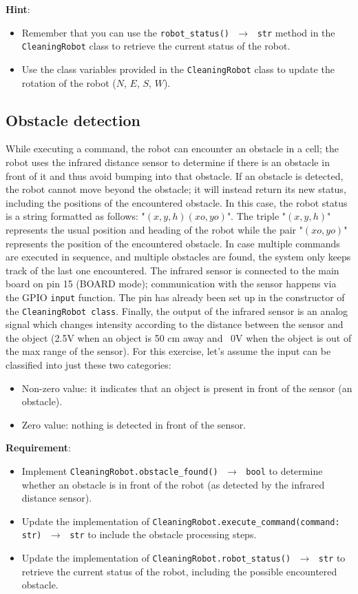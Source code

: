 \noindent\textbf{Hint}:
\begin{itemize}
    \item Remember that you can use the \texttt{robot\_status() $\,\to\,$ str} method in the \texttt{CleaningRobot} class to retrieve the current status of the robot.
    \item Use the class variables provided in the \texttt{CleaningRobot} class to update the rotation of the robot ($N$, $E$, $S$, $W$).
\end{itemize}


\subsection{Obstacle detection}
While executing a command, the robot can encounter an obstacle in a cell;  the robot uses the infrared distance sensor to determine if there is an obstacle in front of it and thus avoid bumping into that obstacle. If an obstacle is detected, the robot cannot move beyond the obstacle; it will instead return its new status, including the positions of the encountered obstacle. In this case, the robot status is a string formatted as follows: "$(x,y,h)(xo,yo)$". The triple "$(x,y,h)$" represents the usual position and heading of the robot while the pair "$(xo,yo)$" represents the position of the encountered obstacle.
In case multiple commands are executed in sequence, and multiple obstacles are found, the system only keeps track of the last one encountered.
The infrared sensor is connected to the main board on pin 15 (BOARD mode); communication with the sensor happens via the GPIO \texttt{input} function. The pin has already been set up in the constructor of the \texttt{CleaningRobot class}. 
Finally, the output of the infrared sensor is an analog signal which changes intensity according to the distance between the sensor and the object (\ie 2.5V when an object is 50 cm away and ~0V when the object is out of the max range of the sensor). For this exercise, let's assume the input can be classified into just these two categories:
\begin{itemize}
    \item Non-zero value: it indicates that an object is present in front of the sensor (\ie an obstacle).
    \item Zero value: nothing is detected in front of the sensor.
\end{itemize}

\noindent\textbf{Requirement}:
\begin{itemize}
    \item Implement \texttt{CleaningRobot.obstacle\_found() $\,\to\,$  bool} to determine whether an obstacle is in front of the robot (as detected by the infrared distance sensor).
    \item Update the implementation of \texttt{CleaningRobot.execute\_command(command: str) $\,\to\,$  str} to include the obstacle processing steps.
    \item Update the implementation of \texttt{CleaningRobot.robot\_status() $\,\to\,$  str} to retrieve the current status of the robot, including the possible encountered obstacle.
\end{itemize}

